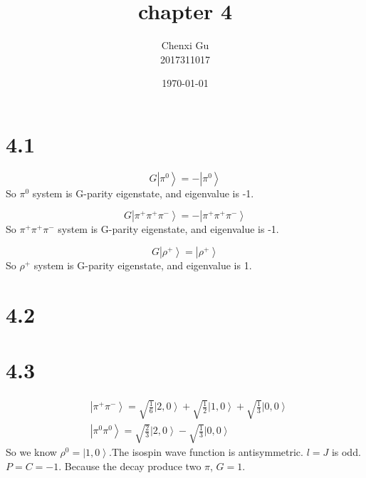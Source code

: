 \documentclass{article}
\begin{document}
\begin{CJK*}{GBK}{song}

\pagestyle{fancy}  
\fancyhead{} %
\renewcommand{\headrulewidth}{0.4pt}  
\renewcommand{\footrulewidth}{0.4pt} 



\title {chapter 4}
\author{Chenxi Gu\\2017311017}

\date{\today}

\maketitle

\section{4.1}
\begin{equation}
G\left|\pi^0\right\rangle=-\left|\pi^0\right\rangle
\end{equation}
So $\pi^0$ system is G-parity eigenstate, and eigenvalue is -1.

\begin{equation}
G\left|\pi^+\pi^+\pi^-\right\rangle=-\left|\pi^+\pi^+\pi^-\right\rangle
\end{equation}
So $\pi^+\pi^+\pi^-$ system is G-parity eigenstate, and eigenvalue is -1.

\begin{equation}
G\left|\rho^+\right\rangle=\left|\rho^+\right\rangle
\end{equation}
So $\rho^+$ system is G-parity eigenstate, and eigenvalue is 1.


\section{4.2}

\section{4.3}
\begin{equation}
\begin{aligned}
&\left|\pi^+\pi^-\right\rangle=\sqrt{\frac{1}{6}}\left|2,0\right\rangle+\sqrt{\frac{1}{2}}\left|1,0\right\rangle+\sqrt{\frac{1}{3}}\left|0,0\right\rangle\\
&\left|\pi^0\pi^0\right\rangle=\sqrt{\frac{2}{3}}\left|2,0\right\rangle-\sqrt{\frac{1}{3}}\left|0,0\right\rangle
\end{aligned}
\end{equation}
So we know $\rho^0=\left|1,0\right\rangle$.The isospin wave function is antisymmetric. $l=J$ is odd.$P=C=-1$.
Because the decay produce two $\pi$, $G=1$.


\end{CJK*}
\end{document}
